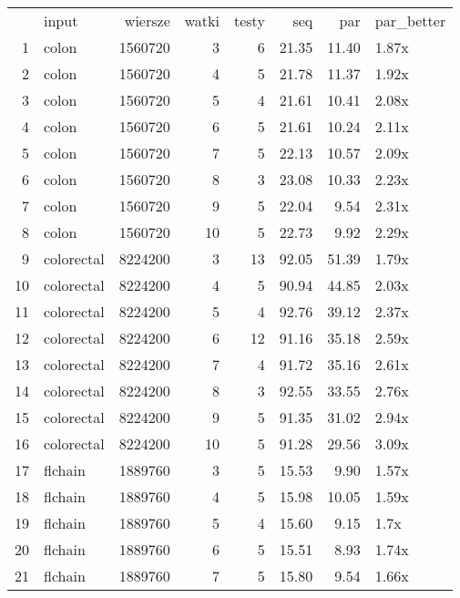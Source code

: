 \begin{table}[ht]
\centering
\begin{tabular}{rlrrrrrl}
  & input & wiersze & watki & testy & seq & par & par\_better \\ 
 1 & colon & 1560720 &   3 &   6 & 21.35 & 11.40 & 1.87x \\ 
   \hline
2 & colon & 1560720 &   4 &   5 & 21.78 & 11.37 & 1.92x \\ 
   \hline
3 & colon & 1560720 &   5 &   4 & 21.61 & 10.41 & 2.08x \\ 
   \hline
4 & colon & 1560720 &   6 &   5 & 21.61 & 10.24 & 2.11x \\ 
   \hline
5 & colon & 1560720 &   7 &   5 & 22.13 & 10.57 & 2.09x \\ 
   \hline
6 & colon & 1560720 &   8 &   3 & 23.08 & 10.33 & 2.23x \\ 
   \hline
7 & colon & 1560720 &   9 &   5 & 22.04 & 9.54 & 2.31x \\ 
   \hline
8 & colon & 1560720 &  10 &   5 & 22.73 & 9.92 & 2.29x \\ 
   \hline
9 & colorectal & 8224200 &   3 &  13 & 92.05 & 51.39 & 1.79x \\ 
   \hline
10 & colorectal & 8224200 &   4 &   5 & 90.94 & 44.85 & 2.03x \\ 
   \hline
11 & colorectal & 8224200 &   5 &   4 & 92.76 & 39.12 & 2.37x \\ 
   \hline
12 & colorectal & 8224200 &   6 &  12 & 91.16 & 35.18 & 2.59x \\ 
   \hline
13 & colorectal & 8224200 &   7 &   4 & 91.72 & 35.16 & 2.61x \\ 
   \hline
14 & colorectal & 8224200 &   8 &   3 & 92.55 & 33.55 & 2.76x \\ 
   \hline
15 & colorectal & 8224200 &   9 &   5 & 91.35 & 31.02 & 2.94x \\ 
   \hline
16 & colorectal & 8224200 &  10 &   5 & 91.28 & 29.56 & 3.09x \\ 
   \hline
17 & flchain & 1889760 &   3 &   5 & 15.53 & 9.90 & 1.57x \\ 
   \hline
18 & flchain & 1889760 &   4 &   5 & 15.98 & 10.05 & 1.59x \\ 
   \hline
19 & flchain & 1889760 &   5 &   4 & 15.60 & 9.15 & 1.7x \\ 
   \hline
20 & flchain & 1889760 &   6 &   5 & 15.51 & 8.93 & 1.74x \\ 
   \hline
21 & flchain & 1889760 &   7 &   5 & 15.80 & 9.54 & 1.66x \\ 

\end{tabular}
\end{table}
